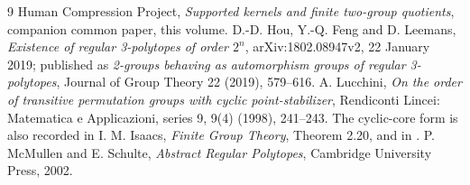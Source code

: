 \begin{thebibliography}{9}
 Human Compression Project, \emph{Supported kernels and
finite two-group quotients}, companion common paper, this volume.
 D.-D. Hou, Y.-Q. Feng and D. Leemans,
\emph{Existence of regular 3-polytopes of order $2^n$},
arXiv:1802.08947v2, 22 January 2019; published as
\emph{2-groups behaving as automorphism groups of regular 3-polytopes},
Journal of Group Theory 22 (2019), 579--616.
 A. Lucchini, \emph{On the order of transitive permutation groups with cyclic point-stabilizer}, Rendiconti Lincei: Matematica e Applicazioni, series 9, 9(4) (1998), 241--243. The cyclic-core form is also recorded in I. M. Isaacs, \emph{Finite Group Theory}, Theorem 2.20,
and in \cite[Proposition 2.9]{HFL}.
 P. McMullen and E. Schulte, \emph{Abstract Regular
Polytopes}, Cambridge University Press, 2002.
\end{thebibliography}



